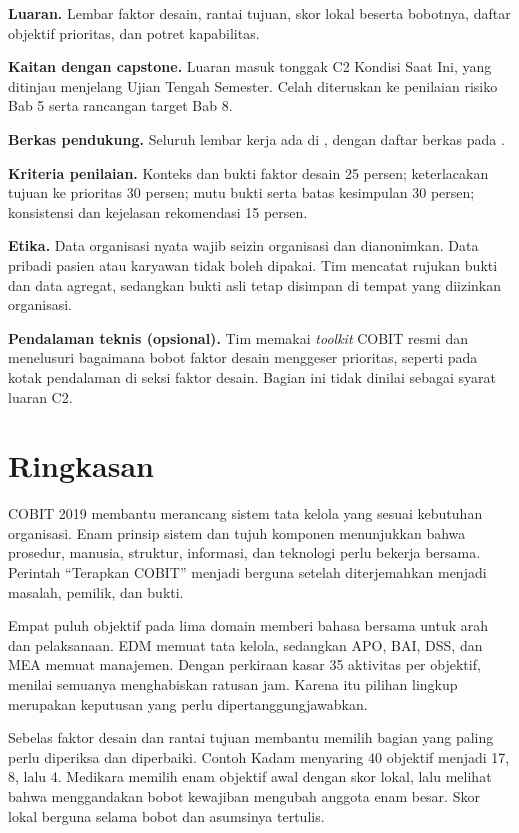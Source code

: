 \textbf{Luaran.} Lembar faktor desain, rantai tujuan, skor lokal beserta bobotnya, daftar objektif prioritas, dan potret kapabilitas.

\textbf{Kaitan dengan capstone.} Luaran masuk tonggak C2 Kondisi Saat Ini, yang ditinjau menjelang Ujian Tengah Semester. Celah diteruskan ke penilaian risiko Bab 5 serta rancangan target Bab 8.

\textbf{Berkas pendukung.} Seluruh lembar kerja ada di , dengan daftar berkas pada .

\textbf{Kriteria penilaian.} Konteks dan bukti faktor desain 25 persen; keterlacakan tujuan ke prioritas 30 persen; mutu bukti serta batas kesimpulan 30 persen; konsistensi dan kejelasan rekomendasi 15 persen.

\textbf{Etika.} Data organisasi nyata wajib seizin organisasi dan dianonimkan. Data pribadi pasien atau karyawan tidak boleh dipakai. Tim mencatat rujukan bukti dan data agregat, sedangkan bukti asli tetap disimpan di tempat yang diizinkan organisasi.

\textbf{Pendalaman teknis (opsional).} Tim memakai \textit{toolkit} COBIT resmi dan menelusuri bagaimana bobot faktor desain menggeser prioritas, seperti pada kotak pendalaman di seksi faktor desain. Bagian ini tidak dinilai sebagai syarat luaran C2.

\section{Ringkasan}

COBIT 2019 membantu merancang sistem tata kelola yang sesuai kebutuhan organisasi. Enam prinsip sistem dan tujuh komponen menunjukkan bahwa prosedur, manusia, struktur, informasi, dan teknologi perlu bekerja
bersama. Perintah ``Terapkan COBIT'' menjadi berguna setelah diterjemahkan menjadi masalah, pemilik, dan bukti.

Empat puluh objektif pada lima domain memberi bahasa bersama untuk arah dan pelaksanaan. EDM memuat tata kelola, sedangkan APO, BAI, DSS, dan MEA memuat manajemen. Dengan perkiraan kasar 35 aktivitas per objektif,
menilai semuanya menghabiskan ratusan jam. Karena itu pilihan lingkup merupakan keputusan yang perlu dipertanggungjawabkan.

Sebelas faktor desain dan rantai tujuan membantu memilih bagian yang paling perlu diperiksa dan diperbaiki. Contoh Kadam menyaring 40 objektif menjadi 17, 8, lalu 4. Medikara memilih enam objektif awal dengan skor lokal,
lalu melihat bahwa menggandakan bobot kewajiban mengubah anggota enam besar. Skor lokal berguna selama bobot dan asumsinya tertulis.

